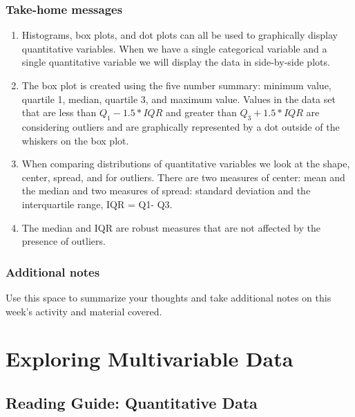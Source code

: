 \documentclass[
]{report}
\begin{document}
\vspace{0.5in}

\hypertarget{take-home-messages-3}{%
\subsection{Take-home messages}\label{take-home-messages-3}}

\begin{enumerate}
\def\labelenumi{\arabic{enumi}.}
\item
  Histograms, box plots, and dot plots can all be used to graphically display quantitative variables. When we have a single categorical variable and a single quantitative variable we will display the data in side-by-side plots.
\item
  The box plot is created using the five number summary: minimum value, quartile 1, median, quartile 3, and maximum value. Values in the data set that are less than \(Q_1 - 1.5*IQR\) and greater than \(Q_3 + 1.5*IQR\) are considering outliers and are graphically represented by a dot outside of the whiskers on the box plot.
\item
  When comparing distributions of quantitative variables we look at the shape, center, spread, and for outliers. There are two measures of center: mean and the median and two measures of spread: standard deviation and the interquartile range, IQR = Q1- Q3.
\item
  The median and IQR are robust measures that are not affected by the presence of outliers.
\end{enumerate}

\hypertarget{additional-notes-3}{%
\subsection{Additional notes}\label{additional-notes-3}}

Use this space to summarize your thoughts and take additional notes on this week's activity and material covered.

\hypertarget{exploring-multivariable-data}{%
\chapter{Exploring Multivariable Data}\label{exploring-multivariable-data}}

\hypertarget{reading-guide-quantitative-data-1}{%
\section{Reading Guide: Quantitative Data}\label{reading-guide-quantitative-data-1}}
\end{document}
